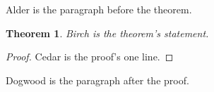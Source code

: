 \documentclass{article}
\newtheorem{theorem}{Theorem}
\begin{document}
Alder is the paragraph before the theorem.
\begin{theorem}
Birch is the theorem's statement.
\end{theorem}
\begin{proof}
Cedar is the proof's one line.
\end{proof}
Dogwood is the paragraph after the proof.
\end{document}
